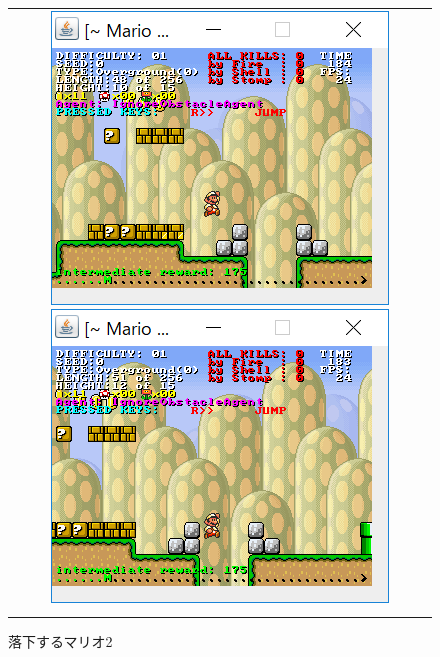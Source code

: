 \documentclass{jsarticle}
\begin{document}
\begin{figure}[H]
	\begin{tabular}{c}
	\begin{minipage}{0.50\hsize}
		\includegraphics{falling1.png}
		\caption{落下するマリオ1}
	\end{minipage}
	\begin{minipage}{0.50\hsize}
		\includegraphics{falling2.png}
		\caption{落下するマリオ2}
	\end{minipage}
\\
	\begin{minipage}{0.06\hsize}
       	 \vspace{10mm}
      \end{minipage}
\\


\end{tabular}
\end{figure}
\end{document}
